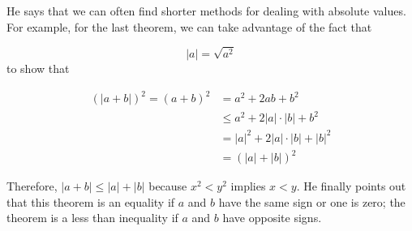 He says that we can often find shorter methods for dealing with absolute values. For
example, for the last theorem, we can take advantage of the fact that

\[
    \lvert a \rvert = \sqrt{a^2}
\]
to show that

\begin{align*}
    (\lvert a + b \rvert)^2 = (a + b)^2 &= a^2 + 2ab + b^2\\
                            &\leq a^2 + 2 \lvert a \rvert \cdot \lvert b \rvert + b^2\\
                            &= \lvert a \rvert^2 + 2\lvert a \rvert \cdot \lvert b \rvert
                            + \lvert b \rvert^2\\
                            &= (\lvert a \rvert + \lvert b \rvert)^2
\end{align*}

Therefore, $\lvert a + b \rvert \leq \lvert a \rvert + \lvert b \rvert$ because $x^2 < y^2$
implies $x < y$. He finally points out that this theorem is an equality if $a$ and $b$
have the same sign or one is zero; the theorem is a less than inequality if $a$ and $b$
have opposite signs.


